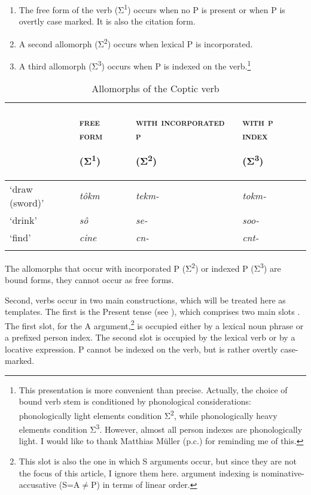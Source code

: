 \documentclass[output=paper]{LSP/langsci}
\begin{document}
\begin{enumerate}
\item The free form of the verb (Σ\textsuperscript{1}) occurs when no P is present or when P is overtly case marked. It is also the citation form.

\item A second allomorph (Σ\textsuperscript{2}) occurs when lexical P is incorporated.

\item A third allomorph (Σ\textsuperscript{3}) occurs when P is indexed on the verb.\footnote{This presentation is more convenient than precise. Actually, the choice of bound verb stem is conditioned by phonological considerations: phonologically light elements condition Σ\textsuperscript{2}, while phonologically heavy elements condition Σ\textsuperscript{3}. However, almost all person indexes are phonologically light. I would like to thank Matthias Müller (p.c.) for reminding me of this.}
\end{enumerate}

\begin{table}
\caption{Allomorphs of the Coptic verb}
\label{05-gr-tab:1}

\begin{tabularx}{\textwidth}{Xlll} 
\lsptoprule
& \textsc{free form}

(Σ\textsuperscript{1}) & \textsc{with incorporated p}

(Σ\textsuperscript{2}) & \textsc{with p index}

(Σ\textsuperscript{3})\\
\midrule
‘draw (sword)’ & \textit{tôkm} & \textit{tekm-} & \textit{tokm-}\\
‘drink’ & \textit{sô} & \textit{se-} & \textit{soo-}\\
‘find’ & \textit{cine} & \textit{cn-} & \textit{cnt-}\\
\lspbottomrule
\end{tabularx}
\end{table}

The allomorphs that occur with incorporated P (Σ\textsuperscript{2}) or indexed P (Σ\textsuperscript{3}) are bound forms, \ie they cannot occur as free forms.

 Second,  verbs occur in two main constructions, which will be treated here as templates. The first is the Present tense (see ), which comprises two main slots \citep{Polotsky1960Coptic}. The first slot, for the A argument,\footnote{This slot is also the one in which S arguments occur, but since they are not the focus of this article, I ignore them here.  argument indexing is nominative-accusative (S=A${\neq}$P) in terms of linear order.} is occupied either by a lexical noun phrase or a prefixed person index. The second slot is occupied by the lexical verb or by a locative expression. P cannot be indexed on the verb, but is rather overtly case-marked.
\end{document}
